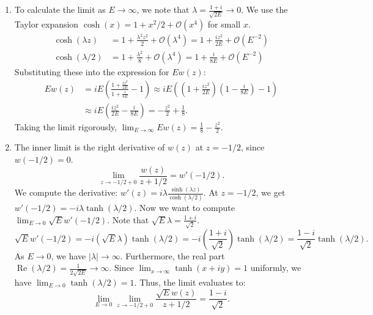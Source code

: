 \documentclass{article}
\begin{document}
\begin{enumerate}[label=\fbox{\arabic*}]
\begin{enumerate}[label=\arabic*.]
          \item To calculate the limit as $E \to \infty$, we note that $\lambda = \frac{1+i}{\sqrt{2E}} \to 0$. We use the Taylor expansion $\cosh(x) = 1 + x^2/2 + \mathcal{O}(x^4)$ for small $x$.
          \begin{align*}
            \cosh(\lambda z) &= 1 + \frac{\lambda^2 z^2}{2} + \mathcal{O}(\lambda^4) = 1 + \frac{i z^2}{2E} + \mathcal{O}(E^{-2}) \\
            \cosh(\lambda/2) &= 1 + \frac{\lambda^2}{8} + \mathcal{O}(\lambda^4) = 1 + \frac{i}{8E} + \mathcal{O}(E^{-2})
          \end{align*}
          Substituting these into the expression for $E w(z)$:
          \begin{align*}
            E w(z) &= i E \left( \frac{1 + \frac{i z^2}{2E}}{1 + \frac{i}{8E}} - 1 \right) \approx i E \left( \left( 1 + \frac{i z^2}{2E} \right) \left( 1 - \frac{i}{8E} \right) - 1 \right) \\
            &\approx i E \left( \frac{i z^2}{2E} - \frac{i}{8E} \right) = - \frac{z^2}{2} + \frac{1}{8}.
          \end{align*}
          Taking the limit rigorously, $\lim_{E \to \infty} E w(z) = \frac{1}{8} - \frac{z^2}{2}$.

          \item The inner limit is the right derivative of $w(z)$ at $z = -1/2$, since $w(-1/2) = 0$.
          \[
            \lim_{z \to -1/2 + 0} \frac{w(z)}{z + 1/2} = w'(-1/2).
          \]
          We compute the derivative: $w'(z) = i \lambda \frac{\sinh(\lambda z)}{\cosh(\lambda/2)}$.
          At $z = -1/2$, we get $w'(-1/2) = -i \lambda \tanh(\lambda/2)$.
          Now we want to compute $\lim_{E \to 0} \sqrt{E} w'(-1/2)$. Note that $\sqrt{E} \lambda = \frac{1+i}{\sqrt{2}}$.
          \[
            \sqrt{E} w'(-1/2) = -i (\sqrt{E} \lambda) \tanh(\lambda/2) = -i \left(\frac{1+i}{\sqrt{2}}\right) \tanh(\lambda/2) = \frac{1-i}{\sqrt{2}} \tanh(\lambda/2).
          \]
          As $E \to 0$, we have $|\lambda| \to \infty$. Furthermore, the real part $\operatorname{Re}(\lambda/2) = \frac{1}{2\sqrt{2E}} \to \infty$. 
          Since $\lim_{x \to \infty} \tanh(x + iy) = 1$ uniformly, we have $\lim_{E \to 0} \tanh(\lambda/2) = 1$.
          Thus, the limit evaluates to:
          \[
            \lim_{E \to 0} \lim_{z \to -1/2 + 0} \frac{\sqrt{E} w(z)}{z + 1/2} = \frac{1-i}{\sqrt{2}}.
          \]
        \end{enumerate}


\end{enumerate}
\end{document}

